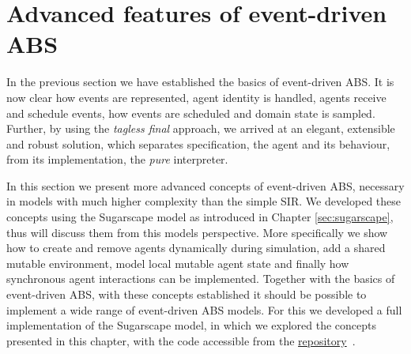 \section{Advanced features of event-driven ABS}
\label{sec:advanced_eventdriven_ABS}

In the previous section we have established the basics of event-driven ABS. It is now clear how events are represented, agent identity is handled, agents receive and schedule events, how events are scheduled and domain state is sampled. Further, by using the \textit{tagless final} approach, we arrived at an elegant, extensible and robust solution, which separates specification, the agent and its behaviour, from its implementation, the \textit{pure} interpreter. 

In this section we present more advanced concepts of event-driven ABS, necessary in models with much higher complexity than the simple SIR. We developed these concepts using the Sugarscape model as introduced in Chapter \ref{sec:sugarscape}, thus will discuss them from this models perspective. More specifically we show how to create and remove agents dynamically during simulation, add a shared mutable environment, model local mutable agent state and finally how synchronous agent interactions can be implemented. Together with the basics of event-driven ABS, with these concepts established it should be possible to implement a wide range of event-driven ABS models. For this we developed a full implementation of the Sugarscape model, in which we explored the concepts presented in this chapter, with the code accessible from the \href{https://github.com/thalerjonathan/haskell-sugarscape}{repository}~\cite{thaler_sugarscape_repository}.









